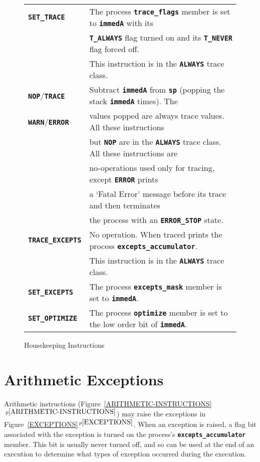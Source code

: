 \documentclass[12pt]{article}
\makeatletter
\newcommand{\TT}[1]{{\tt \bfseries #1}}
\newcommand{\ttkey}[1]{\TT{#1}\index{#1@{\tt #1}}}
\newcommand{\itemref}[1]{\ref{#1}$\,^{p\pageref{#1}}$}
\newcommand{\EOL}{\penalty \exhyphenpenalty}
\newlength{\figurewidth}
\newenvironment{boxedfigure}[1][!btp]%
	{\begin{figure*}[#1]
	 \begin{lrbox}{\figurebox}
	 \begin{minipage}{\figurewidth}

	 \vspace*{1ex}}%
	{
	 \vspace*{1ex}

	 \end{minipage}
	 \end{lrbox}

	 \centering
	 \fbox{\hspace*{0.1in}\usebox{\figurebox}\hspace*{0.1in}}
	 \end{figure*}}
\makeatother
\begin{document}
\begin{boxedfigure}

\begin{center}
\small
\begin{tabular}{|l|l|}
\hline
\ttkey{SET\_TRACE}
    & The process \TT{trace\_flags} member is set to \TT{immedA} with its\\
    & \TT{T\_ALWAYS} flag turned on and its \TT{T\_NEVER} flag forced off. \\
    & This instruction is in the \TT{ALWAYS} trace class.
\\\hline
\ttkey{NOP}/\ttkey{TRACE}
    & Subtract \TT{immedA} from
      \TT{sp} (popping the stack \TT{immedA} times).  The \\
\ttkey{WARN}/\ttkey{ERROR}
    & values popped are always trace values.  All these instructions \\
    & but \TT{NOP} are in the \TT{ALWAYS} trace class.  All these instructions
      are \\
    & no-operations used only for tracing, except \TT{ERROR} prints \\
    & a `Fatal Error' message before its trace and then terminates \\
    & the process with an \TT{ERROR\_STOP} state.
\\\hline
\ttkey{TRACE\_EXCEPTS}
    & No operation.  When traced prints the process
      \TT{excepts\_accumulator}.  \\
    & This instruction is in the \TT{ALWAYS} trace class.
\\\hline
\ttkey{SET\_EXCEPTS}
    & The process \TT{excepts\_mask} member is set to \TT{immedA}.
\\\hline
\ttkey{SET\_OPTIMIZE}
    & The process \TT{optimize} member is set to the low order bit
      of \TT{immedA}.
\\\hline
\end{tabular}
\end{center}
\vspace*{-3ex}
\caption{Housekeeping Instructions}
\label{HOUSEKEEPING-INSTRUCTIONS}
\end{boxedfigure}

\section{Arithmetic Exceptions}
\label{ARITHMETIC-EXCEPTIONS}

Arithmetic instructions (Figure~\itemref{ARITHMETIC-INSTRUCTIONS})
may raise the exceptions in Figure~\itemref{EXCEPTIONS}.
When an exception is raised, a flag bit associated with the
exception is turned on the process's \TT{excepts\_\EOL accumulator}
member.  This bit is usually never turned off, and so can be used at the
end of an execution to determine what types of exception
occurred during the execution.
\end{document}
